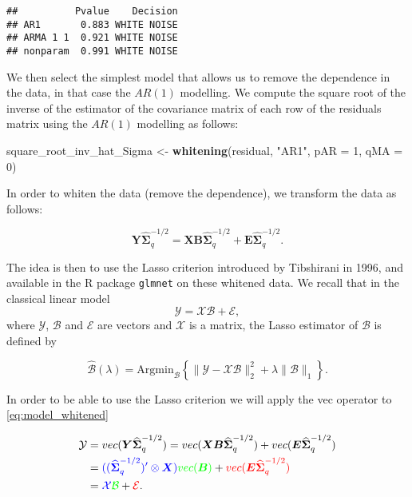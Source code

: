 \documentclass[]{article}
\newenvironment{Shaded}{\begin{snugshade}}{\end{snugshade}}
\newcommand{\KeywordTok}[1]{\textcolor[rgb]{0.13,0.29,0.53}{\textbf{#1}}}
\newcommand{\DataTypeTok}[1]{\textcolor[rgb]{0.13,0.29,0.53}{#1}}
\newcommand{\DecValTok}[1]{\textcolor[rgb]{0.00,0.00,0.81}{#1}}
\newcommand{\StringTok}[1]{\textcolor[rgb]{0.31,0.60,0.02}{#1}}
\newcommand{\NormalTok}[1]{#1}
\begin{document}
\begin{verbatim}
##          Pvalue    Decision
## AR1       0.883 WHITE NOISE
## ARMA 1 1  0.921 WHITE NOISE
## nonparam  0.991 WHITE NOISE
\end{verbatim}

We then select the simplest model that allows us to remove the
dependence in the data, in that case the \(AR(1)\) modelling. We compute
the square root of the inverse of the estimator of the covariance matrix
of each row of the residuals matrix using the \(AR(1)\) modelling as
follows:

\begin{Shaded}
\begin{Highlighting}[]
\NormalTok{square_root_inv_hat_Sigma <-}\StringTok{ }\KeywordTok{whitening}\NormalTok{(residual, }\StringTok{"AR1"}\NormalTok{, }\DataTypeTok{pAR =} \DecValTok{1}\NormalTok{, }\DataTypeTok{qMA =} \DecValTok{0}\NormalTok{)}
\end{Highlighting}
\end{Shaded}

In order to whiten the data (remove the dependence), we transform the
data as follows:

\begin{equation}\label{eq:model_whitened}
\boldsymbol{Y}\widehat{\boldsymbol{\Sigma}}_q^{-1/2}  
    =\boldsymbol{X}\boldsymbol{B}\widehat{\boldsymbol{\Sigma}}_q^{-1/2} + \boldsymbol{E}\widehat{\boldsymbol{\Sigma}}_q^{-1/2}.
\end{equation}

The idea is then to use the Lasso criterion introduced by Tibshirani in
1996, and available in the R package \texttt{glmnet} on these whitened
data. We recall that in the classical linear model
\[{\mathcal{Y}}={\mathcal{X}}\mathcal{B}+{\mathcal{E}},\] where
\(\mathcal{Y}\), \(\mathcal{B}\) and \(\mathcal{E}\) are vectors and
\(\mathcal{X}\) is a matrix, the Lasso estimator of \(\mathcal{B}\) is
defined by

\begin{equation*}
      \widehat{\mathcal{B}}(\lambda)=\textrm{Argmin}_\mathcal{B}\left\{\|\mathcal{Y}-\mathcal{X}\mathcal{B}\|_2^2+\lambda\|\mathcal{B}\|_1\right\}.
    \end{equation*}

In order to be able to use the Lasso criterion we will apply the vec
operator to \eqref{eq:model_whitened}

\begin{align*}
      {\mathcal{Y}}&=
                     vec(\boldsymbol{Y}\widehat{\boldsymbol{\Sigma}}_q^{-1/2})  
=vec(\boldsymbol{X}\boldsymbol{B}\widehat{\boldsymbol{\Sigma}}_q^{-1/2})
                     +vec(\boldsymbol{E}\widehat{\boldsymbol{\Sigma}}_q^{-1/2})\\
                   &=\textcolor{blue}{((\widehat{\boldsymbol{\Sigma}}_q^{-1/2})'\otimes \boldsymbol{X})}\textcolor{green}{vec(\boldsymbol{B})}
                     +\textcolor{red}{vec(\boldsymbol{E}\widehat{\boldsymbol{\Sigma}}_q^{-1/2})}\\
                   &=\textcolor{blue}{\mathcal{X}}\textcolor{green}{\mathcal{B}}+\textcolor{red}{\mathcal{E}}.
    \end{align*}
\end{document}
